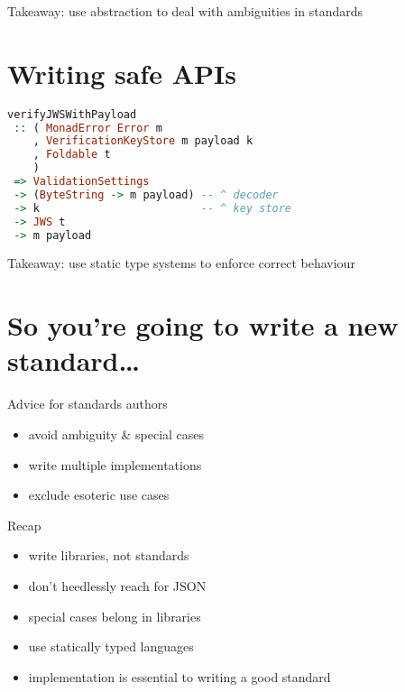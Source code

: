 \documentclass[ignorenonframetext,aspectratio=43]{beamer}
\providecommand{\tightlist}{%
  \setlength{\itemsep}{0pt}\setlength{\parskip}{0pt}}
\begin{document}
\begin{frame}[plain]
\huge
Takeaway: use abstraction to deal with ambiguities in standards
\end{frame}

\section{Writing safe APIs}

\begin{frame}[fragile]
\begin{lstlisting}[language=Haskell]
verifyJWSWithPayload
 :: ( MonadError Error m
    , VerificationKeyStore m payload k
    , Foldable t
    )
 => ValidationSettings
 -> (ByteString -> m payload) -- ^ decoder
 -> k                         -- ^ key store
 -> JWS t
 -> m payload
\end{lstlisting}
\end{frame}


\begin{frame}[plain]
\huge
Takeaway: use static type systems to enforce correct behaviour
\end{frame}





\section{So you're going to write a new standard\ldots}

\begin{frame}{Advice for standards authors}
\begin{itemize}
\tightlist
\item avoid ambiguity \& special cases
\item write multiple implementations
\item exclude esoteric use cases
\end{itemize}
\end{frame}


\begin{frame}{Recap}
\begin{itemize}
\tightlist
\item write libraries, not standards
\item don't heedlessly reach for JSON
\item special cases belong in libraries
\item use statically typed languages
\item implementation is essential to writing a good standard
\end{itemize}
\end{frame}
\end{document}
